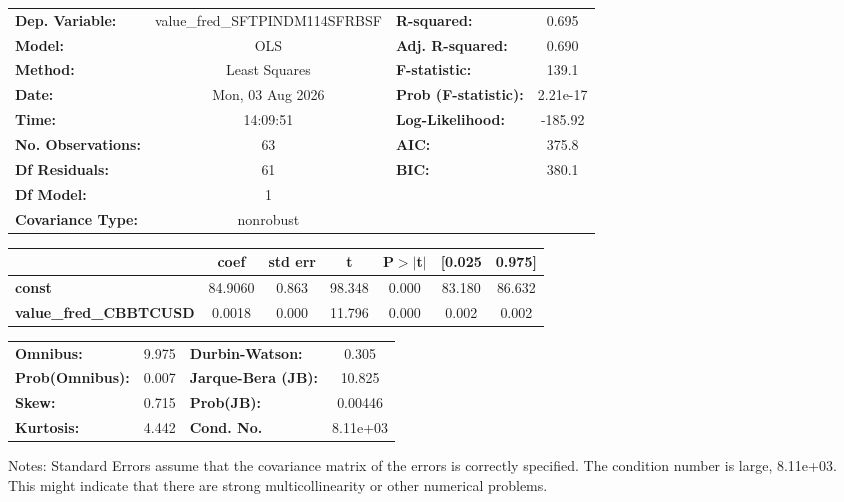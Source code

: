 \begin{center}
\begin{tabular}{lclc}
\toprule
\textbf{Dep. Variable:}        & value\_fred\_SFTPINDM114SFRBSF & \textbf{  R-squared:         } &     0.695   \\
\textbf{Model:}                &              OLS               & \textbf{  Adj. R-squared:    } &     0.690   \\
\textbf{Method:}               &         Least Squares          & \textbf{  F-statistic:       } &     139.1   \\
\textbf{Date:}                 &        Mon, 03 Aug 2026        & \textbf{  Prob (F-statistic):} &  2.21e-17   \\
\textbf{Time:}                 &            14:09:51            & \textbf{  Log-Likelihood:    } &   -185.92   \\
\textbf{No. Observations:}     &                 63             & \textbf{  AIC:               } &     375.8   \\
\textbf{Df Residuals:}         &                 61             & \textbf{  BIC:               } &     380.1   \\
\textbf{Df Model:}             &                  1             & \textbf{                     } &             \\
\textbf{Covariance Type:}      &           nonrobust            & \textbf{                     } &             \\
\bottomrule
\end{tabular}
\begin{tabular}{lcccccc}
                               & \textbf{coef} & \textbf{std err} & \textbf{t} & \textbf{P$> |$t$|$} & \textbf{[0.025} & \textbf{0.975]}  \\
\midrule
\textbf{const}                 &      84.9060  &        0.863     &    98.348  &         0.000        &       83.180    &       86.632     \\
\textbf{value\_fred\_CBBTCUSD} &       0.0018  &        0.000     &    11.796  &         0.000        &        0.002    &        0.002     \\
\bottomrule
\end{tabular}
\begin{tabular}{lclc}
\textbf{Omnibus:}       &  9.975 & \textbf{  Durbin-Watson:     } &    0.305  \\
\textbf{Prob(Omnibus):} &  0.007 & \textbf{  Jarque-Bera (JB):  } &   10.825  \\
\textbf{Skew:}          &  0.715 & \textbf{  Prob(JB):          } &  0.00446  \\
\textbf{Kurtosis:}      &  4.442 & \textbf{  Cond. No.          } & 8.11e+03  \\
\bottomrule
\end{tabular}
\end{center}

Notes: \newline
 [1] Standard Errors assume that the covariance matrix of the errors is correctly specified. \newline
 [2] The condition number is large, 8.11e+03. This might indicate that there are \newline
 strong multicollinearity or other numerical problems.